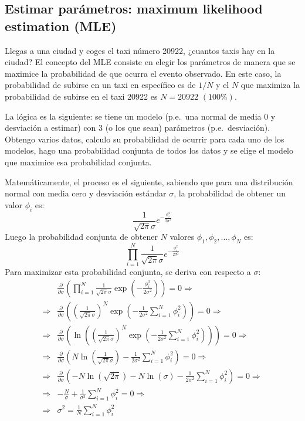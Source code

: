 \subsection{Estimar parámetros: maximum likelihood estimation (MLE)}
Llegas a una ciudad y coges el taxi número 20922, ¿cuantos taxis hay en la ciudad? El concepto del MLE consiste en elegir los parámetros de manera que se maximice la probabilidad de que ocurra el evento observado. En este caso, la probabilidad de subirse en un taxi en específico es de $1/N$ y el $N$ que maximiza la probabilidad de subirse en el taxi 20922 es $N=20922$ $(100\%)$.

La lógica es la siguiente: se tiene un modelo (p.e.\ una normal de media 0 y desviación a estimar) con 3 (o los que sean) parámetros (p.e.\ desviación). Obtengo varios datos, calculo su probabilidad de ocurrir para cada uno de los modelos, hago una probabilidad conjunta de todos los datos y se elige el modelo que maximice esa probabilidad conjunta.

Matemáticamente, el proceso es el siguiente, sabiendo que para una distribución normal con media cero y desviación estándar $\sigma$, la probabilidad de obtener un valor $\phi_i$ es:
\[
\frac{1}{\sqrt{2\pi}\sigma} e^{-\frac{\phi_i^2}{2\sigma^2}}
\]
Luego la probabilidad conjunta de obtener $N$ valores $\phi_1, \phi_2, \dots, \phi_N$ es:
\[
\prod_{i=1}^N \frac{1}{\sqrt{2\pi}\sigma} e^{-\frac{\phi_i^2}{2\sigma^2}}
\]
Para maximizar esta probabilidad conjunta, se deriva con respecto a $\sigma$:
\begin{align*}
    &\frac{\partial}{\partial \sigma} \left( \prod_{i=1}^N \frac{1}{\sqrt{2\pi}\sigma} \exp\left(-\frac{\phi_i^2}{2\sigma^2}\right) \right) = 0 \Rightarrow \\
    \Rightarrow &\frac{\partial}{\partial \sigma} \left( \left( \frac{1}{\sqrt{2\pi}\sigma} \right)^N \exp\left(-\frac{1}{2\sigma^2} \sum_{i=1}^N \phi_i^2\right) \right) = 0 \Rightarrow \\
    \Rightarrow &\frac{\partial}{\partial \sigma} \left( \ln\left(\left( \frac{1}{\sqrt{2\pi}\sigma} \right)^N \exp\left(-\frac{1}{2\sigma^2} \sum_{i=1}^N \phi_i^2\right)\right) \right) = 0 \Rightarrow \\
    \Rightarrow &\frac{\partial}{\partial \sigma} \left( N\ln\left(\frac{1}{\sqrt{2\pi}\sigma}\right) - \frac{1}{2\sigma^2} \sum_{i=1}^N \phi_i^2 \right) = 0 \Rightarrow \\
    \Rightarrow &\frac{\partial}{\partial \sigma} \left( -N\ln\left(\sqrt{2\pi}\right) -N\ln\left(\sigma\right) - \frac{1}{2\sigma^2} \sum_{i=1}^N \phi_i^2 \right) = 0 \Rightarrow \\
    \Rightarrow &-\frac{N}{\sigma} + \frac{1}{\sigma^3} \sum_{i=1}^N \phi_i^2 = 0 \Rightarrow \\
    \Rightarrow &\sigma^2 = \frac{1}{N} \sum_{i=1}^N \phi_i^2
\end{align*}



